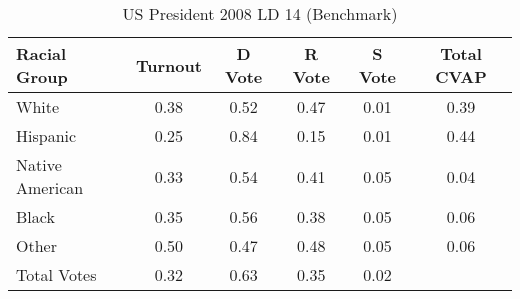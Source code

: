 \begin{table}[htb]
\begin{center}
\caption{US President 2008 LD 14 (Benchmark)}
\label{pres08_cvap_ld_14_benchmark}
\begin{tabular}{lccccc}
  \hline
Racial Group & Turnout & D Vote & R Vote & S Vote & Total CVAP \\ 
  \hline
White & 0.38 & 0.52 & 0.47 & 0.01 & 0.39 \\ 
  Hispanic & 0.25 & 0.84 & 0.15 & 0.01 & 0.44 \\ 
  Native American & 0.33 & 0.54 & 0.41 & 0.05 & 0.04 \\ 
  Black & 0.35 & 0.56 & 0.38 & 0.05 & 0.06 \\ 
  Other & 0.50 & 0.47 & 0.48 & 0.05 & 0.06 \\ 
  Total Votes & 0.32 & 0.63 & 0.35 & 0.02 &  \\ 
   \hline
\end{tabular}
\end{center}
\end{table}
